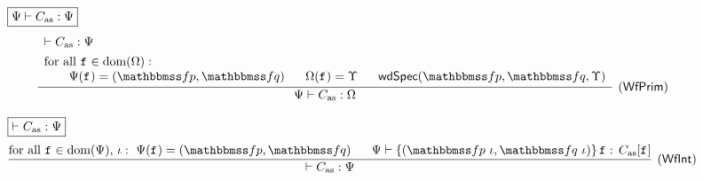 \begin{figure*}[!t]
    \centering
    \subfigure
    {
        \begin{minipage}{1\linewidth}
            $\boxed{{\Psi} \vdash {C_{\text{as}}} : {\Psi}}$ \quad \ \
            \[
				\infer[(\myrule{WfPrim})]
				{
					\wfprim{\Cspec}{\asmimp}{\hprimset}
				}
				{
                    \begin{array}{l}
                        \wfcdhp{\asmimp}{\Cspec} \\
                        \\[-8pt]
                        \TYPE{for all } \lab{} \in \dom(\hprimset): \\
                        \qquad
                        \Cspec(\lab{}) = (\relspecpre, \relspecpost)
                        \quad \ \
                        \hprimset(\lab{}) = \hprim \quad \ \
                        \wdSpec{\relspecpre}{\relspecpost}
                        	{\hprim}
                    \end{array}
				}
			\]
		\end{minipage}
    }

    \subfigure
    {
        \begin{minipage}{1\textwidth}
            $\boxed{\vdash {C_{\text{as}}} : {\Psi}}$ \quad \ \ 
            \[
                \infer[(\myrule{WfInt})]
                {
                    \wfcdhp{\asmimp}{\Cspec}
                }
                {
                    \TYPE{for all } \lab{} \in \dom(\Cspec), \,
                    \lgvl : \
                    \Cspec(\lab{}) = (\relspecpre, \relspecpost)
                    \quad \ \
                    \wdcblk{\Cspec}{\relspecpre \ \lgvl}
                        {\relspecpost \ \lgvl}{\lab{}}
                        {\asmimp[\lab{}]}
                }
            \]
        \end{minipage}
    }


\end{figure*}
